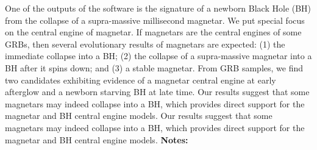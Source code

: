 \documentclass{report}
\begin{document}
{{{{{{{{{{{{{{{{{{{{{{{{{{{{{{{{{One of the outputs of the software is the signature of a newborn Black Hole (BH) from the collapse of a supra-massive millisecond magnetar. We put special focus on the central engine of magnetar. If magnetars are the central engines of some GRBs, then several evolutionary results of magnetars are expected: (1) the immediate collapse into a BH; (2) the collapse of a supra-massive magnetar into a BH after it spins down; and (3) a stable magnetar. From GRB samples, we find two candidates exhibiting evidence of a magnetar central engine at early afterglow and a newborn starving BH at late time. Our results suggest that some magnetars may indeed collapse into a BH, which provides direct support for the magnetar and BH central engine models. Our results suggest that some magnetars may indeed collapse into a BH, which provides direct support for the magnetar and BH central engine models.\newline
{\bf Notes:}\newline
{\newpage
}}}}}}}}}}}}}}}}}}}}}}}}}}}}}}}}}}
\end{document}
